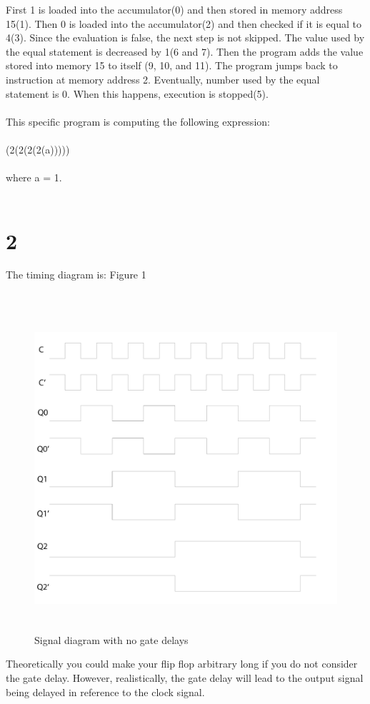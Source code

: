 \documentclass{article}
\begin{document}
    First 1 is loaded into the accumulator(0) and then stored in memory address 15(1). Then 0 is loaded into the accumulator(2) and then checked if it is equal to 4(3).
    Since the evaluation is false, the next step is not skipped. The value used by the equal statement is decreased by 1(6 and 7).
    Then the program adds the value stored into memory 15 to itself (9, 10, and 11). The program jumps back to instruction at memory address 2. Eventually, number used by the
    equal statement is 0. When this happens, execution is stopped(5).\\
	\\
    This specific program is computing the following expression:\\
    \\
    (2(2(2(2(a)))))\\
    \\
    where a = 1.\\
    \\
    \pagebreak
    
    \section{2}
    The timing diagram is: Figure 1\\
    \\
    \begin{figure}
        \includegraphics[height=12cm, angle=0]{FlipFlop.png}
        \caption{Signal diagram with no gate delays}
    \end{figure}
    Theoretically you could make your flip flop arbitrary long if you do not consider the gate delay. However, realistically, the gate delay will
    lead to the output signal being delayed in reference to the clock signal.
    \pagebreak
\end{document}
